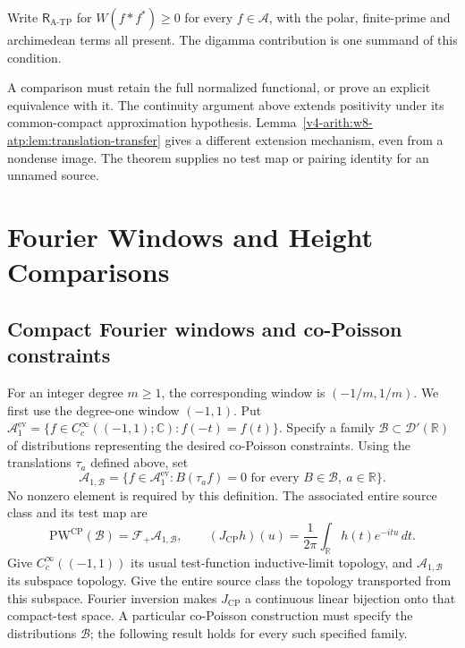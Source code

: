 \begin{definition}
\label{v4-arith:w8-atp:defn:consolidated-residual}
Write $\mathsf R_{\mathrm{A\text{-}TP}}$ for
$W(f*f^*)\geq0$ for every $f\in\mathscr A$, with the polar,
finite-prime and archimedean terms all present. The digamma contribution
is one summand of this condition.
\end{definition}

\begin{remark}
\label{v4-arith:w8-atp:rem:fivefold}
A comparison must retain the full normalized functional, or prove an
explicit equivalence with it. The continuity argument above extends
positivity under its common-compact approximation hypothesis.
Lemma~\ref{v4-arith:w8-atp:lem:translation-transfer} gives a different
extension mechanism, even from a nondense image.
The theorem supplies no test map or pairing identity for an unnamed source.
\end{remark}

\section{Fourier Windows and Height Comparisons}
\label{v4-arith:w8-atp:new-closures}

\subsection{Compact Fourier windows and co-Poisson constraints}
\label{v4-arith:w8-atp:new-closures:RS}

For an integer degree $m\geq1$, the corresponding window is
$(-1/m,1/m)$. We first use the degree-one window $(-1,1)$.
Put $\mathscr A_1^{\mathrm{ev}}
=\{f\in C_c^\infty((-1,1);\mathbb C):f(-t)=f(t)\}$.
Specify a family $\mathcal B\subset\mathscr D'(\mathbb R)$
of distributions representing the desired co-Poisson constraints.
Using the translations $\tau_a$ defined above, set
\[
 \mathscr A_{1,\mathcal B}
 =\{f\in\mathscr A_1^{\mathrm{ev}}:
       B(\tau_a f)=0\text{ for every }B\in\mathcal B,
                                      \ a\in\mathbb R\}.
\]
No nonzero element is required by this definition. The associated
entire source class and its test map are
\begin{equation}
\label{v4-arith:w8-atp:eq:PW-CP-RS}
 \mathrm{PW}^{\mathrm{CP}}(\mathcal B)
 =\mathcal F_+\mathscr A_{1,\mathcal B},\qquad
 (J_{\mathrm{CP}}h)(u)
 =\frac1{2\pi}\int_{\mathbb R}h(t)e^{-itu}\,dt.
\end{equation}
Give $C_c^\infty((-1,1))$ its usual test-function inductive-limit
topology, and $\mathscr A_{1,\mathcal B}$ its subspace topology.
Give the entire source class the topology transported from this subspace. Fourier inversion makes
$J_{\mathrm{CP}}$ a continuous linear bijection onto that
compact-test space. A particular co-Poisson construction must
specify the distributions $\mathcal B$; the following result
holds for every such specified family.


